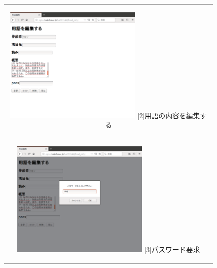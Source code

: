 \documentclass[12pt,a4paper]{jarticle}
\begin{document}
\begin{ttfamily}
\begin{figure}[htbp]
\begin{center}
\begin{tabular}{c}
      \begin{minipage}{0.55\hsize}
        \begin{center}
          \includegraphics[width=6.7cm]{10-3-12.eps}
          \hspace{1.6cm} [2]用語の内容を編集する
        \end{center}
      \end{minipage}

      \begin{minipage}{0.55\hsize}
        \vspace{30mm}
      \end{minipage} \\
 
      \begin{minipage}{0.5\hsize}
        \begin{center}
          \includegraphics[width=6.7cm]{10-3-13.eps}
          \hspace{1.6cm} [3]パスワード要求
        \end{center}
      \end{minipage}


\end{tabular}
\end{center}
\end{figure}
\end{ttfamily}
\end{document}
